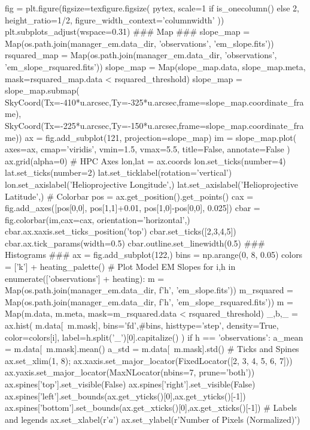 \begin{pycode}[manager_em]
fig = plt.figure(figsize=texfigure.figsize(
    pytex,
    scale=1 if is_onecolumn() else 2,
    height_ratio=1/2,
    figure_width_context='columnwidth'
))
plt.subplots_adjust(wspace=0.31)
### Map ###
slope_map = Map(os.path.join(manager_em.data_dir, 'observations', 'em_slope.fits'))
rsquared_map = Map(os.path.join(manager_em.data_dir, 'observations', 'em_slope_rsquared.fits'))
slope_map = Map(slope_map.data, slope_map.meta, mask=rsquared_map.data < rsquared_threshold)
slope_map = slope_map.submap(
    SkyCoord(Tx=-410*u.arcsec,Ty=-325*u.arcsec,frame=slope_map.coordinate_frame),
    SkyCoord(Tx=-225*u.arcsec,Ty=-150*u.arcsec,frame=slope_map.coordinate_frame))
ax = fig.add_subplot(121, projection=slope_map)
im = slope_map.plot(
    axes=ax,
    cmap='viridis',
    vmin=1.5,
    vmax=5.5,
    title=False,
    annotate=False
)
ax.grid(alpha=0)
# HPC Axes
lon,lat = ax.coords
lon.set_ticks(number=4)
lat.set_ticks(number=2)
lat.set_ticklabel(rotation='vertical')
lon.set_axislabel('Helioprojective Longitude',)
lat.set_axislabel('Helioprojective Latitude',)
# Colorbar
pos = ax.get_position().get_points()
cax = fig.add_axes([pos[0,0], pos[1,1]+0.01, pos[1,0]-pos[0,0], 0.025])
cbar = fig.colorbar(im,cax=cax, orientation='horizontal',)
cbar.ax.xaxis.set_ticks_position('top')
cbar.set_ticks([2,3,4,5])
cbar.ax.tick_params(width=0.5)
cbar.outline.set_linewidth(0.5)
### Histograms ###
ax = fig.add_subplot(122,)
bins = np.arange(0, 8, 0.05)
colors = ['k'] + heating_palette()
# Plot Model EM Slopes
for i,h in enumerate(['observations'] + heating):
    m = Map(os.path.join(manager_em.data_dir, f'{h}', 'em_slope.fits'))
    m_rsquared = Map(os.path.join(manager_em.data_dir, f'{h}', 'em_slope_rsquared.fits'))
    m = Map(m.data, m.meta, mask=m_rsquared.data < rsquared_threshold)
    _,b,_ = ax.hist(
        m.data[~m.mask],
        bins='fd',#bins,
        histtype='step',
        density=True,
        color=colors[i],
        label=h.split('_')[0].capitalize()
    )
    if h == 'observations':
        a_mean = m.data[~m.mask].mean()
        a_std = m.data[~m.mask].std()
# Ticks and Spines
ax.set_xlim(1, 8);
ax.xaxis.set_major_locator(FixedLocator([2, 3, 4, 5, 6, 7]))
ax.yaxis.set_major_locator(MaxNLocator(nbins=7, prune='both'))
ax.spines['top'].set_visible(False)
ax.spines['right'].set_visible(False)
ax.spines['left'].set_bounds(ax.get_yticks()[0],ax.get_yticks()[-1])
ax.spines['bottom'].set_bounds(ax.get_xticks()[0],ax.get_xticks()[-1])
# Labels and legends
ax.set_xlabel(r'$a$')
ax.set_ylabel(r'Number of Pixels (Normalized)')

\end{pycode}
